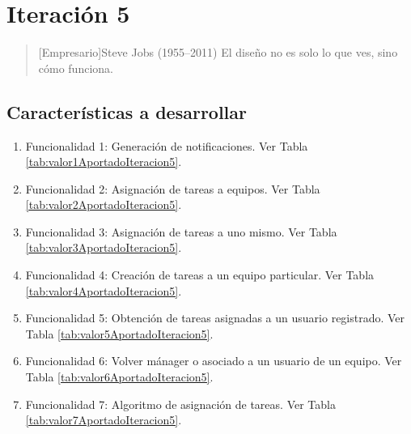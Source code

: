 \chapter{Iteración 5}

\begin{quotation}[Empresario]{Steve Jobs (1955--2011)}
El diseño no es solo lo que ves, sino cómo funciona.
\end{quotation}

\begin{abstract}
En este capítulo reflejaremos todos y cada uno de los costes que se han de reflejar a la hora de desarrollar el proyecto así como la relación de funcionalidades que se desarrollan con estos costes.
\end{abstract}

\section{Características a desarrollar}

\begin{enumerate}
\item Funcionalidad 1: Generación de notificaciones. Ver Tabla \ref{tab:valor1AportadoIteracion5}.
\item Funcionalidad 2: Asignación de tareas a equipos. Ver Tabla \ref{tab:valor2AportadoIteracion5}.
\item Funcionalidad 3: Asignación de tareas a uno mismo. Ver Tabla \ref{tab:valor3AportadoIteracion5}.
\item Funcionalidad 4: Creación de tareas a un equipo particular. Ver Tabla \ref{tab:valor4AportadoIteracion5}.
\item Funcionalidad 5: Obtención de tareas asignadas a un usuario registrado. Ver Tabla \ref{tab:valor5AportadoIteracion5}.
\item Funcionalidad 6: Volver mánager o asociado a un usuario de un equipo. Ver Tabla \ref{tab:valor6AportadoIteracion5}.
\item Funcionalidad 7: Algoritmo de asignación de tareas. Ver Tabla \ref{tab:valor7AportadoIteracion5}.
\end{enumerate}

